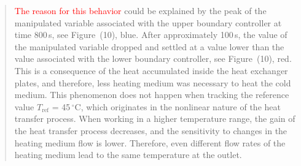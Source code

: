 \documentclass[a4paper,10pt]{article}
\newcommand{\change}[1]{\textcolor{red}{#1}}
\begin{document}
{\begin{quote}
			\change{The reason for this behavior} could be explained by the peak of the manipulated variable associated with the upper boundary controller at time 800\,s, see Figure~(10), blue. After approximately 100\,s, the value of the manipulated variable dropped and settled at a value lower than the value associated with the lower boundary controller, see Figure~(10), red. This is a consequence of the heat accumulated inside the heat exchanger plates, and therefore, less heating medium was necessary to heat the cold medium. This phenomenon does not happen when tracking the reference value $T_{\mathrm{ref}}$ = 45\,$^{\circ}\mathrm{C}$, which originates in the nonlinear nature of the heat transfer process. When working in a higher temperature range, the gain of the heat transfer process decreases, and the sensitivity to changes in the heating medium flow is lower. Therefore, even different flow rates of the heating medium lead to the same temperature at the outlet.
		\end{quote}
		

		
		  
		
		
		
		
		
}
\end{document}
